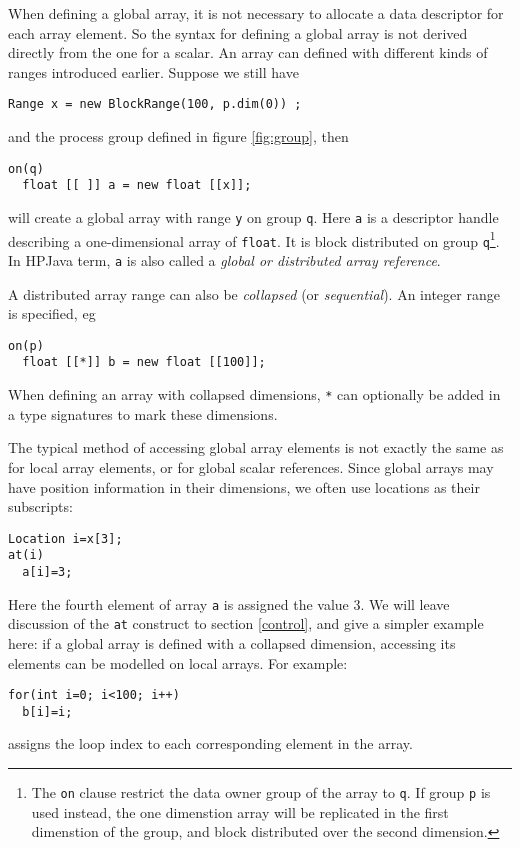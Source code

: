When defining a global array, it is not necessary to allocate a data
descriptor for each array element.  So the syntax for defining a global
array is not derived directly from the one for a scalar.  An array
can defined with different kinds of ranges introduced earlier.
Suppose we still have
\small
\begin{verbatim}
Range x = new BlockRange(100, p.dim(0)) ;
\end{verbatim}
\normalsize
and the process group defined in figure \ref{fig:group}, then
\small
\begin{verbatim}
on(q) 
  float [[ ]] a = new float [[x]];
\end{verbatim}
\normalsize
will create a global array with range \texttt{y} on group \texttt{q}.
Here \texttt{a} is a descriptor handle describing a one-dimensional
array of \texttt{float}. It is block distributed on group
\texttt{q}\footnote{The \texttt{on} clause restrict the data owner
group of the array to \texttt{q}. If group \texttt{p} is used instead,
the one dimenstion array will be replicated in the first dimenstion of
the group, and block distributed over the second dimension.}.  In
HPJava term, \texttt{a} is also called a \emph{global or distributed
array reference}.

A distributed array range can also be \emph{collapsed} (or
\emph{sequential}).  An integer range is specified, eg
\small
\begin{verbatim}
on(p)
  float [[*]] b = new float [[100]];
\end{verbatim}
\normalsize
When defining an array with collapsed dimensions, \texttt{*} can
optionally be added in a type signatures to mark these dimensions.

The typical method of accessing global array elements is not exactly
the same as for local array elements, or for global scalar references.
Since global arrays may have position information in their
dimensions, we often use locations as their subscripts:
\small
\begin{verbatim}
Location i=x[3];
at(i)
  a[i]=3;
\end{verbatim}
\normalsize
Here the fourth element of array \texttt{a} is assigned the value 3.
We will leave discussion of the \texttt{at} construct to section
\ref{control}, and give a simpler example here:
if a global array is defined with a collapsed dimension, accessing
its elements can be modelled on local arrays.  For example:
\small
\begin{verbatim}
for(int i=0; i<100; i++)
  b[i]=i;
\end{verbatim}
\normalsize
assigns the loop index to each corresponding element in the array.

